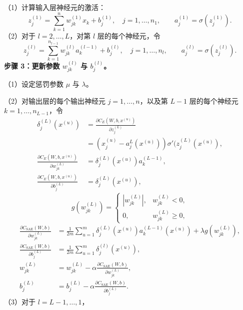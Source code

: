（1）计算输入层神经元的激活：
\[
z_j^{(1)}=\sum_{k=1}^nw_{jk}^{(1)}x_k+b_j^{(1)},\quad j=1,\ldots,n_1,
\qquad a_j^{(1)}=\sigma(z_j^{(1)}).
\]
（2）对于 $l=2,\ldots,L$，对第 $l$ 层的每个神经元，令
\[
z_j^{(l)}=\sum_{k=1}^{n_{l-1}}w_{jk}^{(l)}a_k^{(l-1)}+b_j^{(l)},\quad j=1,\ldots,n_l,
\qquad a_j^{(l)}=\sigma(z_j^{(l)}).
\]
\noindent\textbf{步骤 3：更新参数 $w_{jk}^{(l)}$ 与 $b_j^{(l)}$。}

（1）设定惩罚参数 $\mu$ 与 $\lambda$。

（2）对输出层的每个输出神经元 $j=1,\ldots,n$，以及第 $L-1$ 层的每个神经元 $k=1,\ldots,n_{L-1}$，令
\[
\begin{aligned}
\delta_j^{(L)}(x^{(u)})&=\frac{\partial C_E(W,b,x^{(u)})}{\partial z_j^{(L)}}\\
&=(x_j^{(u)}-a_j^L(x^{(u)}))\sigma'\bigl(z_j^{(L)}(x^{(u)}),\\
\frac{\partial C_E(W,b,x^{(u)})}{\partial w_{jk}^{(L)}}&=\delta_j^{(L)}(x^{(u)})a_k^{(L-1)},\\
\frac{\partial C_E(W,b,x^{(u)})}{\partial b_j^{(L)}}&=\delta_j^{(L)}(x^{(u)}),
\end{aligned}
\]
\[
g(w_{jk}^{(L)})=\begin{cases}|w_{jk}^{(L)}|,&w_{jk}^{(L)}<0,\\0,&w_{jk}^{(L)}\geq0,\end{cases}
\]
\[
\begin{aligned}
\frac{\partial C_{\mathrm{SAE}}(W,b)}{\partial w_{jk}^{(L)}}&=\frac1{2m}\sum_{u=1}^m\delta_j^{(L)}(x^{(u)})a_k^{(L-1)}(x^{(u)})+\lambda g(w_{jk}^{(L)}),\\
\frac{\partial C_{\mathrm{SAE}}(W,b)}{\partial b_j^{(L)}}&=\frac1{2m}\sum_{u=1}^m\delta_j^{(l)}(x^{(u)}),\\
w_{jk}^{(L)}&=w_{jk}^{(L)}-\alpha\frac{\partial C_{\mathrm{SAE}}(W,b)}{\partial w_{jk}^{(L)}},\\
b_j^{(L)}&=b_j^{(L)}-\alpha\frac{\partial C_{\mathrm{SAE}}(W,b)}{\partial b_j^{(L)}}.
\end{aligned}
\]
（3）对于 $l=L-1,\ldots,1$，
